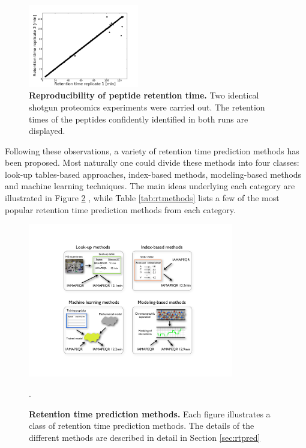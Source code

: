 \documentclass[a4paper]{article}
\begin{document}
\begin{figure}
\vspace{-10pt}
\centering
\includegraphics[trim=0.5cm 0cm 2cm 1.5cm, clip=true, width=0.43\textwidth]{img/reproducibility.pdf}
\caption{\label{fig:repr} {\bf Reproducibility of peptide retention
    time.} Two identical shotgun proteomics experiments were carried
  out. The retention times of the peptides confidently identified in
  both runs are displayed.}
\vspace{-60pt}
\end{figure}

Following these observations, a variety of retention time prediction
methods has been proposed. Most naturally one could divide these
methods into four classes: look-up tables-based approaches,
index-based methods, modeling-based methods and machine learning
techniques. The main ideas underlying each category are illustrated in
Figure \ref{fig:methods} , while Table \ref{tab:rtmethods} lists a few
of the most popular retention time prediction methods from each
category.

\begin{figure}[!h]
\centering \includegraphics[clip=true,
  width=0.8\textwidth]{img/methods.pdf}
\caption{\label{fig:methods} {\bf Retention time prediction methods.}
  Each figure illustrates a class of retention time prediction
  methods. The details of the different methods are described in
  detail in Section \ref{sec:rtpred}}.
\vspace{-7pt}
\end{figure}
\end{document}
